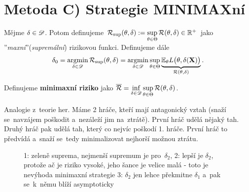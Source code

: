 \section{Metoda C) Strategie MINIMAXní}
\begin{define}
	Mějme $\delta\in\mathscr{D}$. Potom definujeme $\mathcal{R}_{\sup}(\theta,\delta):=\sup\limits_{\theta\in\Theta} \mathcal{R}(\theta,\delta) \in\mathbb{R}^+$ jako ''\textit{maxní}''(\textit{supremální}) rizikovou funkci. Definujeme dále
	$$ \delta_0=\mathop{\mathrm{argmin}}\limits_{\delta\in\mathscr{D}}\mathcal{R}_{\sup}(\theta,\delta)=\mathop{\mathrm{argmin}}\limits_{\delta\in\mathscr{D} }\sup\limits_{\theta\in\Theta}\underbrace{\mathbb{E}_\theta L\big(\theta,\delta(\textbf{X})\big)}_{\mathcal{R}(\theta,\delta)}.$$
\end{define}

\begin{define}
	Definujeme \textbf{minimaxní riziko} jako $\overline{\mathcal{R}}=\inf\limits_{\delta\in\mathscr{D}}\sup\limits_{\theta\in\Theta}\mathcal{R}(\theta,\delta)$.
\end{define}

\begin{remark}
	Analogie z~teorie her. Máme 2 hráče, kteří mají antagonický vztah (snaží se~navzájem poškodit a~nezáleží jim na~ztrátě). První hráč udělá nějaký tah. Druhý hráč pak udělá tah, který co nejvíc poškodí 1. hráče. První hráč to předvídá a~snaží se~tedy minimalizovat nejhorší možnou ztrátu.
\end{remark}

\begin{figure}[h]
	\centering
	\caption{1: zeleně suprema, nejmenší supremum je pro~$\delta_2$, 2: lepší je $\delta_2$, protože ač je riziko vysoké, jeho šance je velice malá - toto je nevýhoda minimaxní strategie 3: $\delta_2$ jen lehce překmitne $\delta_1$ a~pak se~k~němu blíží asymptoticky}
\end{figure}

